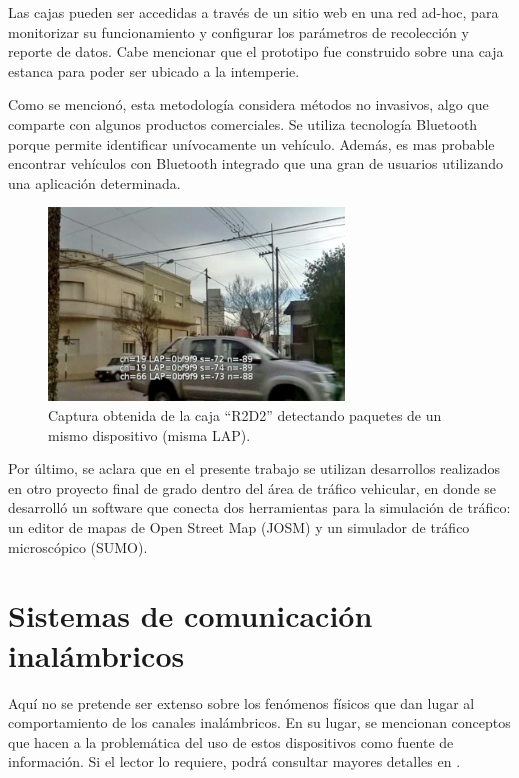 Las cajas pueden ser accedidas a través de un sitio web en una red ad-hoc, para monitorizar su funcionamiento y configurar los parámetros de recolección y reporte de datos. Cabe mencionar que el prototipo fue construido sobre una caja estanca para poder ser ubicado a la intemperie.

Como se mencionó, esta metodología considera métodos no invasivos, algo que comparte con algunos productos comerciales. Se utiliza tecnología Bluetooth porque permite identificar unívocamente un vehículo. Además, es mas probable encontrar vehículos con Bluetooth integrado que una gran de usuarios utilizando una aplicación determinada.

\begin{figure}[!htp]
\centering
\includegraphics[width=0.7\textwidth]{images/ubertooth-capture.png}
\captionsetup{width=.7\linewidth}
\caption{Captura obtenida de la caja ``R2D2'' detectando paquetes de un mismo dispositivo (misma LAP).}
\label{fig:ubertooth-capture} 
\end{figure}

Por último, se aclara que en el presente trabajo se utilizan desarrollos realizados en otro proyecto final de grado dentro del área de tráfico vehicular, en donde se desarrolló un software que conecta dos herramientas para la simulación de tráfico: un editor de mapas de Open Street Map (JOSM) y un simulador de tráfico microscópico (SUMO).

\section{Sistemas de comunicación inalámbricos}

Aquí no se pretende ser extenso sobre los fenómenos físicos que dan lugar al comportamiento de los canales inalámbricos. En su lugar, se mencionan conceptos que hacen a la problemática del uso de estos dispositivos como fuente de información. Si el lector lo requiere, podrá consultar mayores detalles en \cite{aragon2008antennas}.


